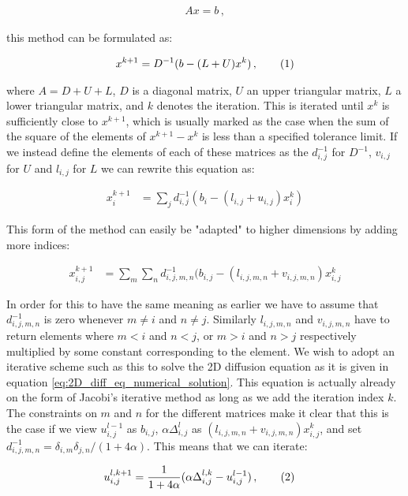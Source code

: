 \documentclass[reprint,english,notitlepage]{revtex4-1}  %
\newcommand\numberthis{\addtocounter{equation}{1}\tag{\theequation}}
\begin{document}
\begin{align*}
Ax = b \, ,
\end{align*}

this method can be formulated as:

\begin{align*}
x^{k+1} = D^{-1}(b - (L+U)x^k) \, , \numberthis \label{eq:jacobi_iterative_method}
\end{align*}

where $A = D + U + L$, $D$ is a diagonal matrix, $U$ an upper triangular matrix, $L$ a lower triangular matrix, and $k$ denotes the iteration. This is iterated until $x^k$ is sufficiently close to $x^{k+1}$, which is usually marked as the case when the sum of the square of the elements of $x^{k+1} - x^k$ is less than a specified tolerance limit. If we instead define the elements of each of these matrices as the $d^{-1}_{i,j}$ for $D^{-1}$, $v_{i,j}$ for $U$ and $l_{i,j}$ for $L$ we can rewrite this equation as:

\begin{align*}
x^{k+1}_i &= \sum\limits_j d^{-1}_{i,j} (b_i - (l_{i,j} + u_{i,j} ) x^k_i)
\end{align*}

This form of the method can easily be "adapted" to higher dimensions by adding more indices:

\begin{align*}
x^{k+1}_{i,j} &= \sum\limits_m \sum\limits_n d^{-1}_{i,j,m,n} (b_{i,j} - (l_{i,j,m,n} + v_{i,j,m,n})x^k_{i,j} 
\end{align*}

In order for this to have the same meaning as earlier we have to assume that $d^{-1}_{i,j,m,n}$ is zero whenever $m \neq i$ and $n \neq j$. Similarly $l_{i,j,m,n}$ and $v_{i,j,m,n}$ have to return elements where $m<i$ and $n<j$, or $m>i$ and $n>j$ respectively multiplied by some constant corresponding to the element. We wish to adopt an iterative scheme such as this to solve the 2D diffusion equation as it is given in equation \eqref{eq:2D_diff_eq_numerical_solution}. This equation is actually already on the form of Jacobi's iterative method as long as we add the iteration index $k$. The constraints on $m$ and $n$ for the different matrices make it clear that this is the case if we view $u_{i,j}^{l-1}$ as $b_{i,j}$, $\alpha \Delta_{i,j}^l$ as $(l_{i,j,m,n} + v_{i,j,m,n})x_{i,j}^k$, and set $d^{-1}_{i,j,m,n} = \delta_{i,m} \delta_{j,n} /(1+4\alpha)$. This means that we can iterate:

\begin{align*}
u_{i,j}^{l,k+1} &= \frac{1}{1 + 4\alpha}(\alpha \Delta_{i,j}^{l,k} - u_{i,j}^{l-1}) \, , \numberthis \label{eq:Jacobi_iteratation_diffusion_2D}
\end{align*} 
\end{document}
